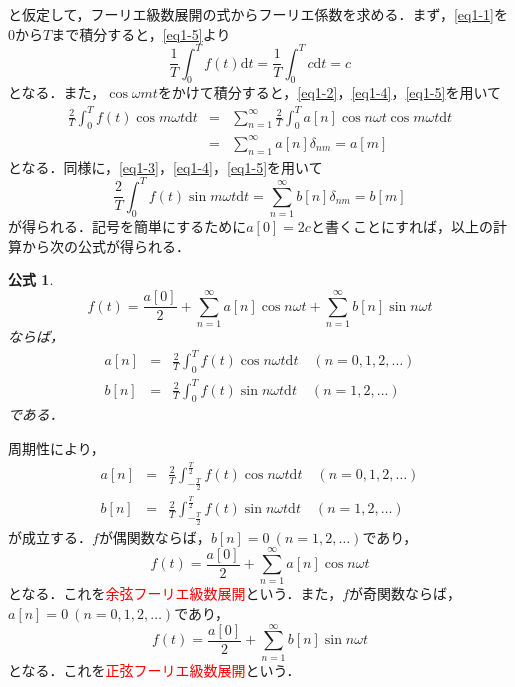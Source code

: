 \documentclass[a4j]{jsbook}
\newtheorem{formula}[theorem]{公式}
\numberwithin{theorem}{chapter}  %
\begin{document}
と仮定して，フーリエ級数展開の式からフーリエ係数を求める．まず，\eqref{eq1-1}を0から\(T\)まで積分すると，\eqref{eq1-5}より
\begin{equation*}
    \frac{1}{T}\int_0^T f(t)\mathrm{d}t=\frac{1}{T}\int_0^T c\mathrm{d}t=c
\end{equation*}
となる．また，\(\cos\omega mt\)をかけて積分すると，\eqref{eq1-2}，\eqref{eq1-4}，\eqref{eq1-5}を用いて
\begin{eqnarray*}
\frac{2}{T}\int_0^T f(t)\cos m\omega t\mathrm{d}t&=&\sum_{n=1}^\infty\frac{2}{T}\int_0^T a[n]\cos n\omega t\cos m\omega t\mathrm{d}t \\
&=&\sum_{n=1}^\infty a[n]\delta_{nm}=a[m]
\end{eqnarray*}
となる．同様に，\eqref{eq1-3}，\eqref{eq1-4}，\eqref{eq1-5}を用いて
\begin{equation*}
    \frac{2}{T}\int_0^T f(t)\sin m\omega t\mathrm{d}t=\sum_{n=1}^\infty b[n]\delta_{nm}=b[m]
\end{equation*}
が得られる．記号を簡単にするために\(a[0]=2c\)と書くことにすれば，以上の計算から次の公式が得られる．
\begin{formula}
\label{formula1-2}
\begin{equation}
    f(t)=\frac{a[0]}{2}+\sum_{n=1}^\infty a[n]\cos n\omega t+\sum_{n=1}^\infty b[n]\sin n\omega t \label{eq1-6}
\end{equation}
ならば，
\begin{eqnarray}
a[n]&=&\frac{2}{T}\int_0^T f(t)\cos n\omega t\mathrm{d}t\quad (n=0, 1, 2, \dots) \\
b[n]&=&\frac{2}{T}\int_0^T f(t)\sin n\omega t\mathrm{d}t\quad (n=1, 2, \dots)
\end{eqnarray}
である．
\end{formula}
周期性により，
\begin{eqnarray}
a[n]&=&\frac{2}{T}\int_{-\frac{T}{2}}^{\frac{T}{2}} f(t)\cos n\omega t\mathrm{d}t\quad (n=0, 1, 2, \dots) \\
b[n]&=&\frac{2}{T}\int_{-\frac{T}{2}}^{\frac{T}{2}} f(t)\sin n\omega t\mathrm{d}t\quad (n=1, 2, \dots)
\end{eqnarray}
が成立する．\(f\)が偶関数ならば，\(b[n]=0\ (n=1, 2, \ldots)\)であり，
\begin{equation*}
    f(t)=\frac{a[0]}{2}+\sum_{n=1}^\infty a[n]\cos n\omega t
\end{equation*}
となる．これを\textcolor{red}{余弦フーリエ級数展開}という．また，\(f\)が奇関数ならば，\(a[n]=0\ (n=0, 1, 2, \ldots)\)であり，
\begin{equation*}
    f(t)=\frac{a[0]}{2}+\sum_{n=1}^\infty b[n]\sin n\omega t
\end{equation*}
となる．これを\textcolor{red}{正弦フーリエ級数展開}という．
\end{document}
